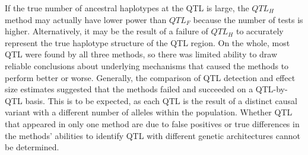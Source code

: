 \documentclass[article,9pt,twocolumn,twoside]{rilabRxiv}
\begin{document}
If the true number of ancestral haplotypes at the QTL is large, the $QTL_H$ method may actually have lower power than $QTL_F$ because the number of tests is higher.
Alternatively, it may be the result of a failure of $QTL_H$ to accurately represent the true haplotype structure of the QTL region.
On the whole, most QTL were found by all three methods, so there was limited ability to draw reliable conclusions about underlying mechanisms that caused the methods to perform better or worse.
Generally, the comparison of QTL detection and effect size estimates suggested that the methods failed and succeeded on a QTL-by-QTL basis.
This is to be expected, as each QTL is the result of a distinct causal variant with a different number of alleles within the population.
Whether QTL that appeared in only one method are due to false positives or true differences in the methods' abilities to identify QTL with different genetic architectures cannot be determined.
\end{document}
